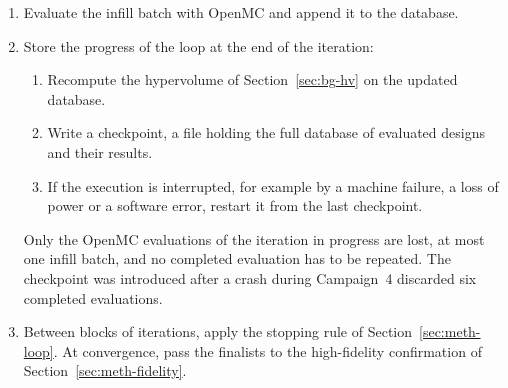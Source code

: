 \begin{enumerate}
        The candidate set and the uncertainty ranking play complementary
        roles:

        \begin{itemize}
          \item The candidate set provides the \emph{exploitation}.
                Every candidate belongs to the rank-1 set of the surrogate
                search, so each is predicted to be among the best designs
                available.

          \item The uncertainty ranking provides the
                \emph{exploration}. Among these promising designs, it
                sends to OpenMC those whose predictions are least
                supported by the data, so each evaluation tests a
                promising region and reduces the uncertainty where it is
                largest.
        \end{itemize}

  \item Evaluate the infill batch with OpenMC and append it to the database.

  \item Store the progress of the loop at the end of the iteration:
        \begin{enumerate}[label=\arabic{enumi}.\arabic*]
          \item Recompute the hypervolume of Section~\ref{sec:bg-hv} on
                the updated database.

          \item Write a checkpoint, a file holding the full database of evaluated designs and their results.

          \item If the execution is interrupted, for example by a machine
                failure, a loss of power or a software error, restart it
                from the last checkpoint.
        \end{enumerate}

        Only the OpenMC evaluations of the iteration in progress are
        lost, at most one infill batch, and no completed evaluation has
        to be repeated. The checkpoint was introduced after a crash
        during Campaign~4 discarded six completed evaluations.

  \item Between blocks of iterations, apply the stopping rule of
        Section~\ref{sec:meth-loop}. At convergence, pass the finalists
        to the high-fidelity confirmation of
        Section~\ref{sec:meth-fidelity}.
\end{enumerate}

